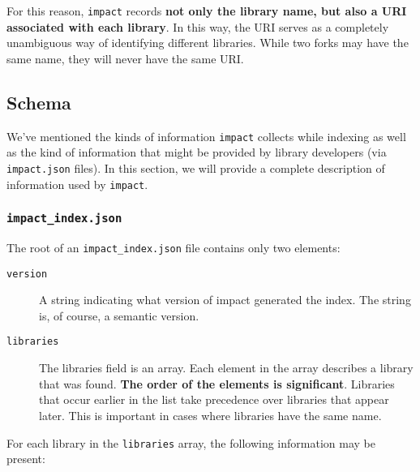 \documentclass[11pt,a4paper,twocolumn]{article}
\newcommand{\code}[1]{\texttt{#1}} %
\begin{document}
For this reason, \code{impact} records \textbf{not only the library name,
  but also a URI associated with each library}.  In this way, the URI
serves as a completely unambiguous way of identifying different
libraries.  While two forks may have the same name, they will never
have the same URI.

\subsection{Schema}

We've mentioned the kinds of information \code{impact} collects while
indexing as well as the kind of information that might be provided by
library developers (via \code{impact.json} files).  In this section,
we will provide a complete description of information used by
\code{impact}.

\subsubsection{\code{impact\_index.json}}
\label{sec:index_schema}

The root of an \code{impact\_index.json} file contains only two
elements:

\begin{description}
  \item[\code{version}] A string indicating what version of impact
    generated the index.  The string is, of course, a semantic
    version.
  \item[\code{libraries}] The libraries field is an array.  Each
    element in the array describes a library that was found.  \textbf{The
      order of the elements is significant}.  Libraries that occur
    earlier in the list take precedence over libraries that appear
    later.  This is important in cases where libraries have the same
    name.
\end{description}

For each library in the \code{libraries} array, the following
information may be present:
\end{document}

